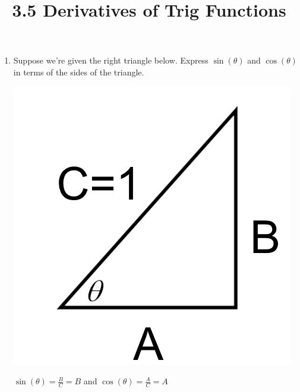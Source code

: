 \documentclass[nooutcomes]{ximera}
\title{3.5 Derivatives of Trig Functions}
\begin{document}
\begin{abstract}		\end{abstract}
\maketitle


\begin{problem} \hfil
	\begin{enumerate}
	\item Suppose we're given the right triangle below.  Express $\sin(\theta)$ and $\cos(\theta)$ in terms of the sides of the triangle.

	\begin{image}
	\includegraphics[scale=.3]{figure1.png}
	\end{image}
	\begin{freeResponse}
	$\sin(\theta)=\frac{B}{C}=B$ and $\cos(\theta)=\frac{A}{C}=A$ 
	\end{freeResponse}


\end{enumerate}
\end{problem}
\end{document}
